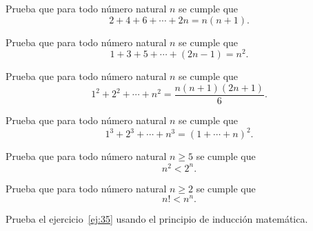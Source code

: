 \documentclass[12pt,a4paper]{book}
\begin{document}
    \begin{ejercicio}\label{ej:52}
        Prueba que para todo número natural $n$ se cumple que
        \begin{equation*}
            2+4+6+\cdots+2n=n(n+1).
        \end{equation*}
    \end{ejercicio}

    \begin{ejercicio}\label{ej:53}
        Prueba que para todo número natural $n$ se cumple que
        \begin{equation*}
            1+3+5+\cdots+(2n-1)=n^{2}.
        \end{equation*}
    \end{ejercicio}

    \begin{ejercicio}\label{ej:54}
        Prueba que para todo número natural $n$ se cumple que
        \begin{equation*}
            1^{2}+2^{2}+\cdots+n^{2}=\frac{n(n+1)(2n+1)}{6}.
        \end{equation*}
    \end{ejercicio}

    \begin{ejercicio}\label{ej:55}
        Prueba que para todo número natural $n$ se cumple que
        \begin{equation*}
            1^{3}+2^{3}+\cdots+n^{3}=(1+\cdots+n)^{2}.
        \end{equation*}
    \end{ejercicio}

    \begin{ejercicio}\label{ej:56}
        Prueba que para todo número natural $n\geq 5$ se cumple que
        \begin{equation*}
            n^{2}<2^{n}.
        \end{equation*}
    \end{ejercicio}

    \begin{ejercicio}\label{ej:57}
        Prueba que para todo número natural $n\geq 2$ se cumple que
        \begin{equation*}
            n!<n^{n}.
        \end{equation*}
    \end{ejercicio}

    \begin{ejercicio}\label{ej:58}
        Prueba el ejercicio~\ref{ej:35} usando el principio de inducción matemática.
    \end{ejercicio}
\end{document}

